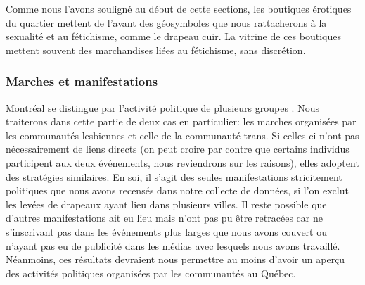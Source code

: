 Comme nous l'avons souligné au début de cette sections, les boutiques érotiques du quartier mettent de l'avant des géosymboles que nous rattacherons à la sexualité et au fétichisme, comme le drapeau cuir.
La vitrine de ces boutiques mettent souvent des marchandises liées au fétichisme, sans discrétion.

\subsubsection{Marches et manifestations}
\label{subsec:label}
Montréal se distingue par l'activité politique de plusieurs groupes \lgbt{}.
Nous traiterons dans cette partie de deux cas en particulier: les marches organisées par les communautés lesbiennes et celle de la communauté trans.
Si celles-ci n'ont pas nécessairement de liens directs (on peut croire par contre que certains individus participent aux deux événements, nous reviendrons sur les raisons), elles adoptent des stratégies similaires.
En soi, il s'agit des seules manifestations stricitement politiques que nous avons recensés dans notre collecte de données, si l'on exclut les levées de drapeaux ayant lieu dans plusieurs villes.
Il reste possible que d'autres manifestations ait eu lieu mais n'ont pas pu être retracées car ne s'inscrivant pas dans les événements plus larges que nous avons couvert ou n'ayant pas eu de publicité dans les médias avec lesquels nous avons travaillé.
Néanmoins, ces résultats devraient nous permettre au moins d'avoir un aperçu des activités politiques organisées par les communautés \lgbt{} au Québec.

